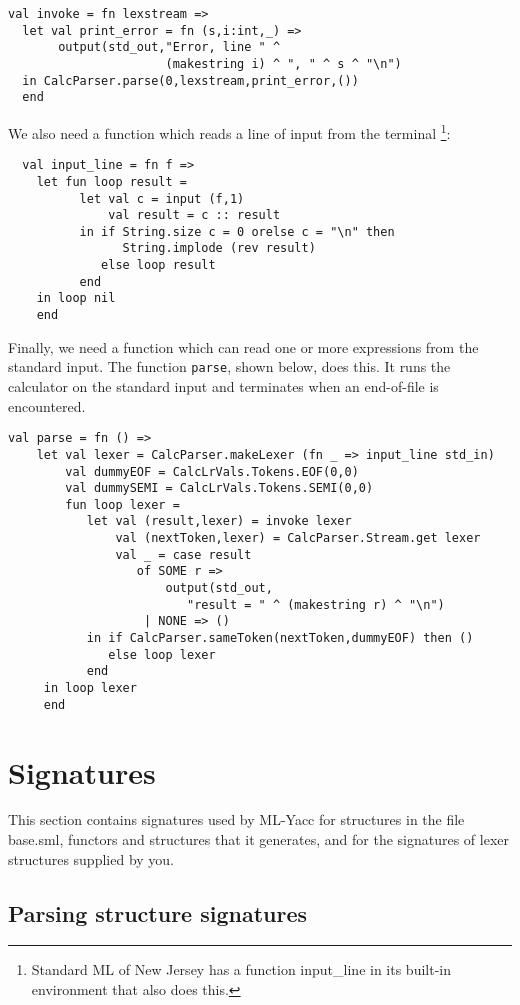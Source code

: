 \begin{verbatim}
val invoke = fn lexstream =>
  let val print_error = fn (s,i:int,_) =>
       output(std_out,"Error, line " ^
                      (makestring i) ^ ", " ^ s ^ "\n")
  in CalcParser.parse(0,lexstream,print_error,())
  end
\end{verbatim}

We also need a function which reads a line of input from the terminal
\footnote{Standard ML of New Jersey has a function input\_line in its
built-in environment that also does this.}:
\begin{verbatim}
  val input_line = fn f =>
    let fun loop result =
          let val c = input (f,1)
              val result = c :: result
          in if String.size c = 0 orelse c = "\n" then
                String.implode (rev result)
             else loop result
          end
    in loop nil
    end
\end{verbatim}

Finally, we need a function which can read one or more expressions from
the standard input.  The function {\tt parse}, shown below, does this.
It runs the calculator on the standard input and terminates 
when an end-of-file is encountered.

\begin{verbatim}
val parse = fn () => 
    let val lexer = CalcParser.makeLexer (fn _ => input_line std_in)
        val dummyEOF = CalcLrVals.Tokens.EOF(0,0)
        val dummySEMI = CalcLrVals.Tokens.SEMI(0,0)
        fun loop lexer =
           let val (result,lexer) = invoke lexer
               val (nextToken,lexer) = CalcParser.Stream.get lexer
               val _ = case result
                  of SOME r =>
                      output(std_out,
                         "result = " ^ (makestring r) ^ "\n")
                   | NONE => ()
           in if CalcParser.sameToken(nextToken,dummyEOF) then ()
              else loop lexer
           end
     in loop lexer
     end
\end{verbatim}

\section{Signatures}

This section contains signatures used by ML-Yacc for structures in
the file base.sml, functors and structures that it generates, and for
the signatures of lexer structures supplied by you.

\subsection{Parsing structure signatures}

